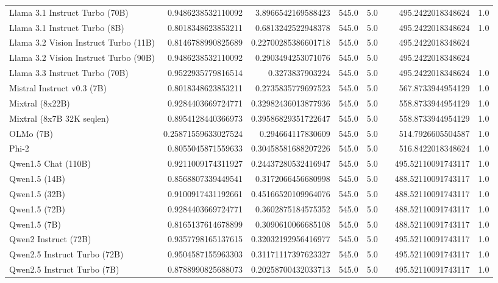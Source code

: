 \begin{table}[htp]
{\begin{tabular}{lrrrrrrr}
Llama 3.1 Instruct Turbo (70B) & 0.9486238532110092 & 3.8966542169588423 & 545.0 & 5.0 &  & 495.2422018348624 & 1.0 \\
Llama 3.1 Instruct Turbo (8B) & 0.8018348623853211 & 0.6813242522948378 & 545.0 & 5.0 &  & 495.2422018348624 & 1.0 \\
Llama 3.2 Vision Instruct Turbo (11B) & 0.8146788990825689 & 0.22700285386601718 & 545.0 & 5.0 &  & 495.2422018348624 &  \\
Llama 3.2 Vision Instruct Turbo (90B) & 0.9486238532110092 & 0.2903494253071076 & 545.0 & 5.0 &  & 495.2422018348624 &  \\
Llama 3.3 Instruct Turbo (70B) & 0.9522935779816514 & 0.3273837903224 & 545.0 & 5.0 &  & 495.2422018348624 & 1.0 \\
Mistral Instruct v0.3 (7B) & 0.8018348623853211 & 0.2735835779697523 & 545.0 & 5.0 &  & 567.8733944954129 & 1.0 \\
Mixtral (8x22B) & 0.9284403669724771 & 0.32982436013877936 & 545.0 & 5.0 &  & 558.8733944954129 & 1.0 \\
Mixtral (8x7B 32K seqlen) & 0.8954128440366973 & 0.39586829351722647 & 545.0 & 5.0 &  & 558.8733944954129 & 1.0 \\
OLMo (7B) & 0.25871559633027524 & 0.294664117830609 & 545.0 & 5.0 &  & 514.7926605504587 & 1.0 \\
Phi-2 & 0.8055045871559633 & 0.30458581688207226 & 545.0 & 5.0 &  & 516.8422018348624 & 1.0 \\
Qwen1.5 Chat (110B) & 0.9211009174311927 & 0.24437280532416947 & 545.0 & 5.0 &  & 495.52110091743117 & 1.0 \\
Qwen1.5 (14B) & 0.8568807339449541 & 0.3172066456680998 & 545.0 & 5.0 &  & 488.52110091743117 & 1.0 \\
Qwen1.5 (32B) & 0.9100917431192661 & 0.45166520109964076 & 545.0 & 5.0 &  & 488.52110091743117 & 1.0 \\
Qwen1.5 (72B) & 0.9284403669724771 & 0.3602875184575352 & 545.0 & 5.0 &  & 488.52110091743117 & 1.0 \\
Qwen1.5 (7B) & 0.8165137614678899 & 0.3090610066685108 & 545.0 & 5.0 &  & 488.52110091743117 & 1.0 \\
Qwen2 Instruct (72B) & 0.9357798165137615 & 0.32032192956416977 & 545.0 & 5.0 &  & 495.52110091743117 & 1.0 \\
Qwen2.5 Instruct Turbo (72B) & 0.9504587155963303 & 0.31171117397623327 & 545.0 & 5.0 &  & 495.52110091743117 & 1.0 \\
Qwen2.5 Instruct Turbo (7B) & 0.8788990825688073 & 0.20258700432033713 & 545.0 & 5.0 &  & 495.52110091743117 & 1.0 \\

\end{tabular}}
\end{table}
